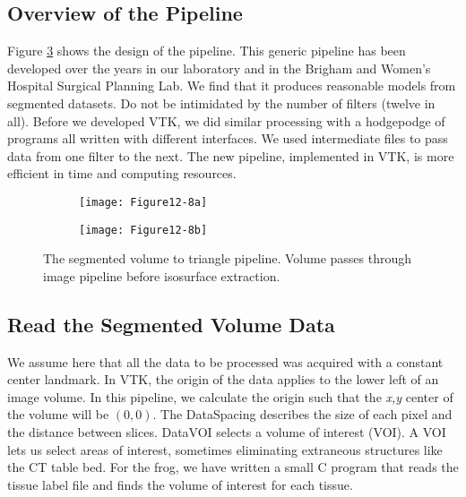 \subsection{Overview of the Pipeline}

Figure \ref{fig:Figure12-8} shows the design of the pipeline. This generic pipeline has been developed over the years in our laboratory and in the Brigham and Women's Hospital Surgical Planning Lab. We find that it produces reasonable models from segmented datasets. Do not be intimidated by the number of filters (twelve in all). Before we developed VTK, we did similar processing with a hodgepodge of programs all written with different interfaces. We used intermediate files to pass data from one filter to the next. The new pipeline, implemented in VTK, is more efficient in time and computing resources.

\begin{figure}[htb]
    \begin{subfigure}[h]{0.36\linewidth}
        \texttt{[image: Figure12-8a]}
        \caption*{}
        \label{fig:Figure12-8a}
    \end{subfigure}
    \hfill
    \begin{subfigure}[h]{0.36\linewidth}
        \texttt{[image: Figure12-8b]}
        \caption*{}
        \label{fig:Figure12-8b}
    \end{subfigure}
    \caption{The segmented volume to triangle pipeline. Volume passes through image pipeline before isosurface extraction.}\label{fig:Figure12-8}
\end{figure}

\subsection{Read the Segmented Volume Data}

We assume here that all the data to be processed was acquired with a constant center landmark. In VTK, the origin of the data applies to the lower left of an image volume. In this pipeline, we calculate the origin such that the \emph{x,y} center of the volume will be $(0,0)$. The DataSpacing describes the size of each pixel and the distance between slices. DataVOI selects a volume of interest (VOI). A VOI lets us select areas of interest, sometimes eliminating extraneous structures like the CT table bed. For the frog, we have written a small C program that reads the tissue label file and finds the volume of interest for each tissue.

